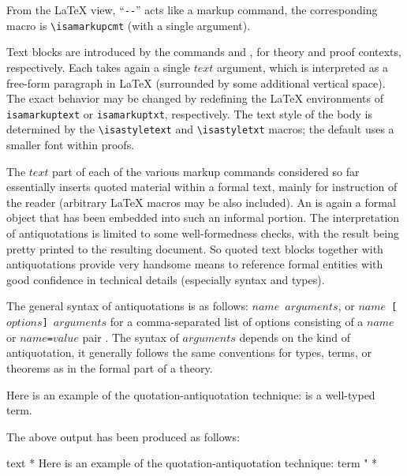 \begin{isabellebody}
\begin{isamarkuptext}
  From the {\LaTeX} view, ``\verb,--,'' acts like a markup command,
  the corresponding macro is \verb,\isamarkupcmt, (with a single
  argument).

  \medskip Text blocks are introduced by the commands 
  and , for theory and proof contexts, respectively.
  Each takes again a single $text$ argument, which is interpreted as a
  free-form paragraph in {\LaTeX} (surrounded by some additional
  vertical space).  The exact behavior may be changed by redefining
  the {\LaTeX} environments of \verb,isamarkuptext, or
  \verb,isamarkuptxt,, respectively.  The text style of the body is
  determined by the \verb,\isastyletext, and \verb,\isastyletxt,
  macros; the default uses a smaller font within proofs.

  \medskip The $text$ part of each of the various markup commands
  considered so far essentially inserts quoted material within a
  formal text, mainly for instruction of the reader (arbitrary
  {\LaTeX} macros may be also included).  An 
  is again a formal object that has been embedded into such an
  informal portion.  The interpretation of antiquotations is limited
  to some well-formedness checks, with the result being pretty printed
  to the resulting document.  So quoted text blocks together with
  antiquotations provide very handsome means to reference formal
  entities with good confidence in technical details (especially
  syntax and types).

  The general syntax of antiquotations is as follows:
  \texttt{{\at}{\ttlbrace}$name$ $arguments${\ttrbrace}}, or
  \texttt{{\at}{\ttlbrace}$name$ [$options$] $arguments${\ttrbrace}}
  for a comma-separated list of options consisting of a $name$ or
  \texttt{$name$=$value$} pair \cite{isabelle-isar-ref}.  The syntax
  of $arguments$ depends on the kind of antiquotation, it generally
  follows the same conventions for types, terms, or theorems as in the
  formal part of a theory.

  \medskip Here is an example of the quotation-antiquotation
  technique:  is a well-typed term.

  \medskip\noindent The above output has been produced as follows:
  \begin{ttbox}
text {\ttlbrace}*
  Here is an example of the quotation-antiquotation technique:
  {\at}{\ttlbrace}term "%
*{\ttrbrace}
  \end{ttbox}


\end{isamarkuptext}
\end{isabellebody}
